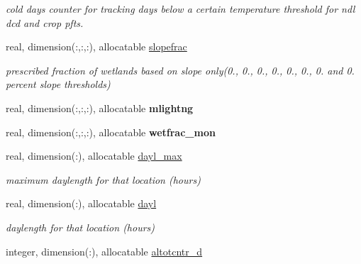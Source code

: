 \begin{DoxyCompactItemize}
\begin{DoxyCompactList}\small\item\em cold days counter for tracking days below a certain temperature threshold for ndl dcd and crop pfts. \end{DoxyCompactList}\item 
\hypertarget{structctem__statevars_1_1veg__rot_a1f2be0347727a2e2d15bdbf6c2e3a8a3}{}real, dimension(\+:,\+:,\+:), allocatable \hyperlink{structctem__statevars_1_1veg__rot_a1f2be0347727a2e2d15bdbf6c2e3a8a3}{slopefrac}\label{structctem__statevars_1_1veg__rot_a1f2be0347727a2e2d15bdbf6c2e3a8a3}

\begin{DoxyCompactList}\small\item\em prescribed fraction of wetlands based on slope only(0., 0., 0., 0., 0., 0., 0. and 0. percent slope thresholds) \end{DoxyCompactList}\item 
\hypertarget{structctem__statevars_1_1veg__rot_a194f7a6b79f0f67d6e543bff2d5fcdc6}{}real, dimension(\+:,\+:,\+:), allocatable {\bfseries mlightng}\label{structctem__statevars_1_1veg__rot_a194f7a6b79f0f67d6e543bff2d5fcdc6}

\item 
\hypertarget{structctem__statevars_1_1veg__rot_a29f940ed875787652f4e246536f13aed}{}real, dimension(\+:,\+:,\+:), allocatable {\bfseries wetfrac\+\_\+mon}\label{structctem__statevars_1_1veg__rot_a29f940ed875787652f4e246536f13aed}

\item 
\hypertarget{structctem__statevars_1_1veg__rot_ae2c141da751b74b5d88423298d9f1693}{}real, dimension(\+:), allocatable \hyperlink{structctem__statevars_1_1veg__rot_ae2c141da751b74b5d88423298d9f1693}{dayl\+\_\+max}\label{structctem__statevars_1_1veg__rot_ae2c141da751b74b5d88423298d9f1693}

\begin{DoxyCompactList}\small\item\em maximum daylength for that location (hours) \end{DoxyCompactList}\item 
\hypertarget{structctem__statevars_1_1veg__rot_adb16590525cc1421465a2e36a893d1bd}{}real, dimension(\+:), allocatable \hyperlink{structctem__statevars_1_1veg__rot_adb16590525cc1421465a2e36a893d1bd}{dayl}\label{structctem__statevars_1_1veg__rot_adb16590525cc1421465a2e36a893d1bd}

\begin{DoxyCompactList}\small\item\em daylength for that location (hours) \end{DoxyCompactList}\item 
\hypertarget{structctem__statevars_1_1veg__rot_a09220f8b9d127aa9b34188398b687773}{}integer, dimension(\+:), allocatable \hyperlink{structctem__statevars_1_1veg__rot_a09220f8b9d127aa9b34188398b687773}{altotcntr\+\_\+d}\label{structctem__statevars_1_1veg__rot_a09220f8b9d127aa9b34188398b687773}


\end{DoxyCompactItemize}
